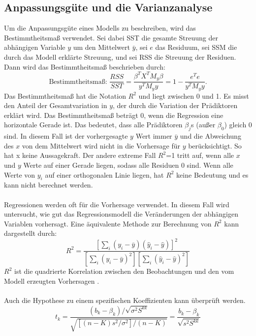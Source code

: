 \subsection{Anpassungsgüte und die Varianzanalyse}
\label{AnpassungsgüteUndDieVarianzanalyse}
Um die Anpassungsgüte eines Modells zu beschreiben, wird das Bestimmtheitsmaß verwendet. Sei dabei \ac{SST} die gesamte Streuung der abhängigen Variable \( y \) um den Mittelwert \( \bar{y} \), sei \(e\) das Residuum, sei \ac{SSM} die durch das Modell erklärte Streuung, und sei \ac{RSS} die Streuung der Residuen. Dann wird das Bestimmtheitsmaß beschrieben durch: 
\begin{equation}
\text{Bestimmtheitsmaß: }\frac{RSS}{SST} = \frac{\beta^{T}X^{T}M_{y}\beta}{y^{T}M_{y}y} = 1 - \frac{e^{T}e}{y^{T}M_{y}y}.
\label{R2kurz}
\end{equation}
Das Bestimmtheitsmaß hat die Notation  \( R^2 \) und liegt zwischen 0 und 1. Es misst den Anteil der Gesamtvariation in \(y\), der durch die Variation der Prädiktoren erklärt wird. Das Bestimmtheitsmaß beträgt 0, wenn die Regression eine horizontale Gerade ist. Das bedeutet, dass alle Prädiktoren $\beta_j$s (außer $\beta_0$) gleich 0 sind. In diesem Fall ist der vorhergesagte $y$ Wert immer $\bar{y}$ und die Abweichung des $x$ von dem Mittelwert wird nicht in die Vorhersage für $y$ berücksichtigt. So hat x keine Aussagekraft. Der andere extreme Fall \(R^2\)=1 tritt auf, wenn alle \(x\) und \(y\) Werte auf einer Gerade liegen, sodass alle Residuen 0 sind. Wenn alle Werte von $y_i$ auf einer orthogonalen Linie liegen, hat $R^2$ keine Bedeutung und es kann nicht berechnet werden.  \\\\ 
Regressionen werden oft für die Vorhersage verwendet. 
In diesem Fall wird untersucht, wie gut das Regressionsmodell die Veränderungen der abhängigen Variablen vorhersagt. Eine äquivalente Methode zur Berechnung von $R^2$ kann dargestellt durch: 
\begin{equation}
R^2 = \frac{\left[\sum_{i}(y_i - \bar{y})(\hat{y}_i - \hat{y})\right]^2}{\left[\sum_{i}(y_i - \bar{y})^2\right]\left[\sum_{i}(\hat{y}_i - \hat{y})^2\right]}
\label{R2Formel}
\end{equation}
$R^2$ ist die quadrierte Korrelation zwischen den Beobachtungen und den vom Modell erzeugten Vorhersagen \cite{greene2003econometric}.\\\\
Auch die Hypothese zu einem spezifischen Koeffizienten kann überprüft werden.  
\begin{equation}
t_k = \frac{(b_k - \beta_k)/\sqrt{\sigma^2 S^{kk}}}{\sqrt{[(n-K)s^2/\sigma^2]/(n-K)}} = \frac{b_k - \beta_k}{\sqrt{s^2 S^{kk}}}
\label{eq:tk_formula}
\end{equation}
